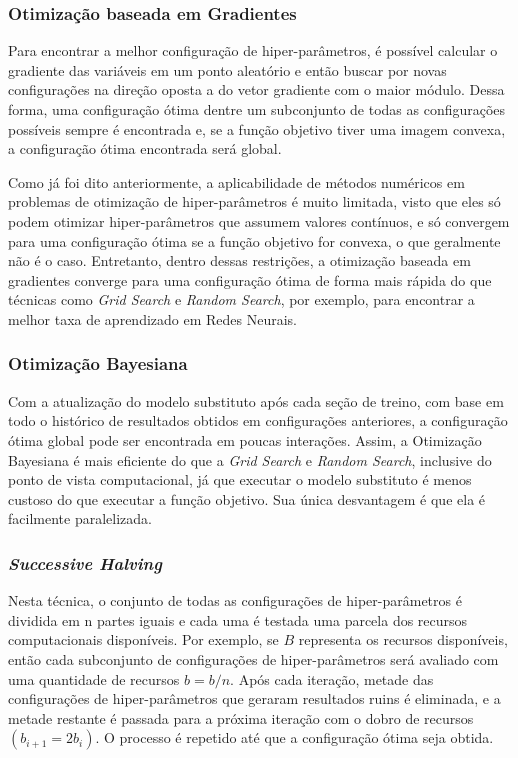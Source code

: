 \subsubsection{Otimização baseada em Gradientes}\label{otimizacao_baseada_em_gradiente}

Para encontrar a melhor configuração de hiper-parâmetros, é possível calcular o gradiente das variáveis em um ponto aleatório e então buscar por novas configurações na direção oposta a do vetor gradiente com o maior módulo. Dessa forma, uma configuração ótima dentre um subconjunto de todas as configurações possíveis sempre é encontrada e, se a função objetivo tiver uma imagem convexa, a configuração ótima encontrada será global.

Como já foi dito anteriormente, a aplicabilidade de métodos numéricos em problemas de otimização de hiper-parâmetros é muito limitada, visto que eles só podem otimizar hiper-parâmetros que assumem valores contínuos, e só convergem para uma configuração ótima se a função objetivo for convexa, o que geralmente não é o caso. Entretanto, dentro dessas restrições, a otimização baseada em gradientes converge para uma configuração ótima de forma mais rápida do que técnicas como \textit{Grid Search} e \textit{Random Search}, por exemplo, para encontrar a melhor taxa de aprendizado em Redes Neurais.

\subsubsection{Otimização Bayesiana}\label{otimizacao_bayesiana}


Com a atualização do modelo substituto após cada seção de treino, com base em todo o histórico de resultados obtidos em configurações anteriores, a configuração ótima global pode ser encontrada em poucas interações. Assim, a Otimização Bayesiana é mais eficiente do que a \textit{Grid Search} e \textit{Random Search}, inclusive do ponto de vista computacional, já que executar o modelo substituto é menos custoso do que executar a função objetivo. Sua única desvantagem é que ela é facilmente paralelizada.

\subsubsection{\textit{Successive Halving}}\label{successive_halving}

Nesta técnica, o conjunto de todas as configurações de hiper-parâmetros é dividida em n partes iguais e cada uma é testada uma parcela dos recursos computacionais disponíveis. Por exemplo, se $B$ representa os recursos disponíveis, então cada subconjunto de configurações de hiper-parâmetros será avaliado com uma quantidade de recursos $b = b / n$. Após cada iteração, metade das configurações de hiper-parâmetros que geraram resultados ruins é eliminada, e a metade restante é passada para a próxima iteração com o dobro de recursos $(b_{i+1} = 2b_{i})$. O processo é repetido até que a configuração ótima seja obtida.

